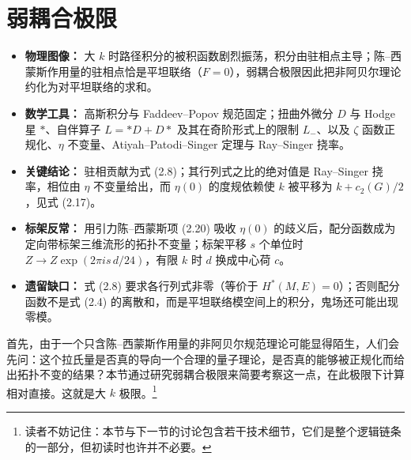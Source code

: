 \documentclass[11pt,a4paper]{article}
\newenvironment{keypoints}{%
    \par\medskip
    \begin{tcolorbox}[enhanced, breakable,
        colback=blue!4!white, colframe=blue!40!black,
        boxrule=0.5pt, arc=2pt, left=6pt, right=6pt, top=4pt, bottom=4pt,
        title={\small\textbf{本节重点}\quad{\footnotesize（译者所加，非原文内容）}},
        fonttitle=\bfseries, coltitle=black, colbacktitle=blue!10!white,
        toptitle=1pt, bottomtitle=1pt]
    \begin{itemize}[leftmargin=1.4em, itemsep=2pt, topsep=2pt, parsep=0pt]
}{%
    \end{itemize}
    \end{tcolorbox}
    \par\medskip
}
\begin{document}

\section{弱耦合极限}

\begin{keypoints}
    \item \textbf{物理图像：} 大 $k$ 时路径积分的被积函数剧烈振荡，积分由驻相点主导；陈–西蒙斯作用量的驻相点恰是平坦联络（$F=0$），弱耦合极限因此把非阿贝尔理论约化为对平坦联络的求和。
    \item \textbf{数学工具：} 高斯积分与 Faddeev--Popov 规范固定；扭曲外微分 $D$ 与 Hodge 星 $\ast$、自伴算子 $L=\ast D+D\ast$ 及其在奇阶形式上的限制 $L_-$、以及 $\zeta$ 函数正规化、$\eta$ 不变量、Atiyah--Patodi--Singer 定理与 Ray--Singer 挠率。
    \item \textbf{关键结论：} 驻相贡献为式 (2.8)；其行列式之比的绝对值是 Ray--Singer 挠率，相位由 $\eta$ 不变量给出，而 $\eta(0)$ 的度规依赖使 $k$ 被平移为 $k+c_2(G)/2$，见式 (2.17)。
    \item \textbf{标架反常：} 用引力陈–西蒙斯项 (2.20) 吸收 $\eta(0)$ 的歧义后，配分函数成为定向带标架三维流形的拓扑不变量；标架平移 $s$ 个单位时 $Z\to Z\exp(2\pi i s\,d/24)$，有限 $k$ 时 $d$ 换成中心荷 $c$。
    \item \textbf{遗留缺口：} 式 (2.8) 要求各行列式非零（等价于 $H^\ast(M,E)=0$）；否则配分函数不是式 (2.4) 的离散和，而是平坦联络模空间上的积分，鬼场还可能出现零模。
\end{keypoints}

首先，由于一个只含陈–西蒙斯作用量的非阿贝尔规范理论可能显得陌生，人们会先问：这个拉氏量是否真的导向一个合理的量子理论，是否真的能够被正规化而给出拓扑不变的结果？本节通过研究弱耦合极限来简要考察这一点，在此极限下计算相对直接。这就是大 $k$ 极限。\footnote{读者不妨记住：本节与下一节的讨论包含若干技术细节，它们是整个逻辑链条的一部分，但初读时也许并不必要。}
\end{document}

